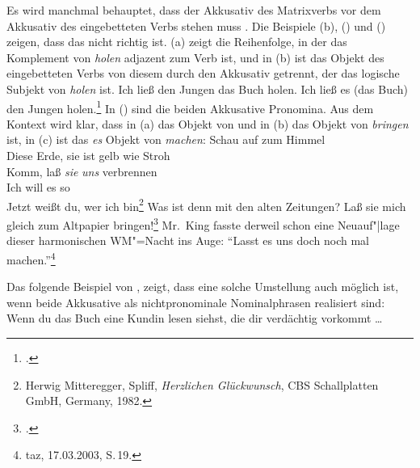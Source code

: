 \noindent
Es wird manchmal behauptet, dass der Akkusativ des Matrixverbs
vor dem Akkusativ des eingebetteten Verbs stehen muss \citep[]{Eisenberg99a}.
Die Beispiele (b), () und () zeigen, dass das nicht richtig ist.
%
(a) zeigt die Reihenfolge, in der das Komplement von \emph{holen} adjazent zum Verb ist,
und in (b) ist das Objekt des eingebetteten Verbs von diesem durch den Akkusativ
getrennt, der das logische Subjekt von \emph{holen} ist.
\eal
\label{ex-liess-den-Jungen-das-Buch-holen}
\ex{} 
Ich ließ den Jungen    das Buch       holen.
\ex 
Ich ließ es       (das Buch)      den Jungen    holen.\footnote{
        .
}
\zl
In () sind die beiden Akkusative Pronomina. Aus dem Kontext wird klar, dass 
in (a) das Objekt von  und in (b) das Objekt von \emph{bringen}
ist, in (c) ist das \emph{es} Objekt von \emph{machen}:
\eal{}
\ex \label{ex-lass-sie-uns-verbrennen}
Schau auf zum Himmel \\
      Diese Erde, sie ist gelb wie Stroh \\
      Komm, laß \emph{sie} \emph{uns} verbrennen \\
      Ich will es so \\
      Jetzt weißt du, wer ich bin\footnote{
        Herwig Mitteregger, Spliff, \emph{Herzlichen Glückwunsch}, CBS Schallplatten GmbH, Germany, 1982.
      }
\ex Was ist denn mit den alten Zeitungen? Laß sie mich gleich zum Altpapier bringen!\footnote{
        .
    }
\ex Mr.~King fasste derweil schon eine Neuauf"|lage dieser harmonischen WM"=Nacht ins Auge: "`Lasst
    es uns doch noch mal machen."'\footnote{
        taz, 17.03.2003, S.\,19.
    }
\zl


\noindent
Das folgende Beispiel von \citet[]{Lenerz93a}, %
zeigt, dass eine solche Umstellung
auch möglich ist, wenn beide Akkusative als nichtpronominale Nominalphrasen realisiert sind:
\ea
Wenn du das Buch eine Kundin lesen siehst, die dir verdächtig vorkommt \ldots
\z


